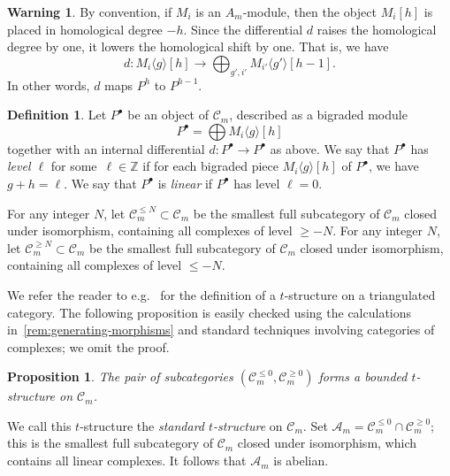 \documentclass{amsart}
\newtheorem{proposition}[theorem]{Proposition}
\theoremstyle{definition}
\newtheorem{definition}[theorem]{Definition}
\newtheorem{warning}[theorem]{Warning}
\newcommand{\darkblue}{\color{darkblue}} %
\newcommand{\defn}[1]{\textsl{\darkblue #1}} %
\begin{document}
\begin{warning}
  By convention, if \(M_i\) is an \(A_m\)-module, then the object \(M_i[h]\) is placed in homological degree \(-h\).
  Since the differential \(d\) raises the homological degree by one, it lowers the homological shift by one.
  That is, we have
  \[d \colon M_i\langle g \rangle[h] \to \bigoplus_{g',i'} M_{i'}\langle g' \rangle[h-1].\]
  In other words, \(d\) maps \(P^h\) to \(P^{h-1}\).
\end{warning}
\begin{definition}\label{def:linear-complex}
  Let \(P^{\bullet}\) be an object of \(\mathcal{C}_m\), described as a bigraded module
  \[P^{\bullet} = \bigoplus M_i\langle g \rangle[h]\]
  together with an internal differential \(d \colon P^{\bullet} \to P^{\bullet}\) as above.
  We say that \(P^{\bullet}\) has \defn{level \(\ell\)} for some~\(\ell \in \mathbb{Z}\) if for each bigraded piece \(M_i \langle g \rangle[h]\) of \(P^{\bullet}\), we have \(g + h = \ell\).
  We say that \(P^{\bullet}\) is \defn{linear} if \(P^{\bullet}\) has level \(\ell = 0\).

\end{definition}
For any integer \(N\), let \(\mathcal{C}_m^{\le N} \subset \mathcal{C}_m\) be the smallest full subcategory of \(\mathcal{C}_m\) closed under isomorphism, containing all complexes of level \(\geq -N\).
For any integer \(N\), let \(\mathcal{C}_m^{\geq N} \subset \mathcal{C}_m\) be the smallest full subcategory of \(\mathcal{C}_m\) closed under isomorphism, containing all complexes of level \(\leq -N\).

We refer the reader to e.g.~\cite[1.3]{bel.ber.del:82} for the definition of a \(t\)-structure on a triangulated category.
The following proposition is easily checked using the calculations in~\cref{rem:generating-morphisms} and standard techniques involving categories of complexes; we omit the proof.
\begin{proposition}
  The pair of subcategories \((\mathcal{C}_m^{\leq 0}, \mathcal{C}_m^{\geq 0})\) forms a bounded \(t\)-structure on \(\mathcal{C}_m\).
\end{proposition}
We call this \(t\)-structure the \defn{standard \(t\)-structure} on \(\mathcal{C}_m\).
Set \(\mathcal{A}_m = \mathcal{C}^{\leq 0}_m \cap \mathcal{C}_m^{\geq 0}\); this is the smallest full subcategory of \(\mathcal{C}_m\) closed under isomorphism, which contains all linear complexes.
It follows that \(\mathcal{A}_m\) is abelian.
\end{document}
